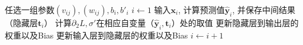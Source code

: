 \begin{frame}

\begin{algorithm}[H]
\SetAlgoLined
\DontPrintSemicolon
{}

任选一组参数$(v_{ij}), (w_{ij}), b_i, b'_i$\;
$i \gets 1$ \;
{
输入$\mathbf{x}_i$, 计算预测值$\widehat{\mathbf{y}}_i$, 并保存中间结果（隐藏层$\mathbf{t}_i$）\;
计算$\partial_2 L, \sigma'$在相应自变量（$\widehat{\mathbf{y}}_i, \mathbf{t}_i$）处的取值 \;
更新隐藏层到输出层的权重以及Bias \;
更新输入层到隐藏层的权重以及Bias \;
$i \gets i+1$ \;
}
\caption{最简单的反向传播算法}
\end{algorithm}

\end{frame}








